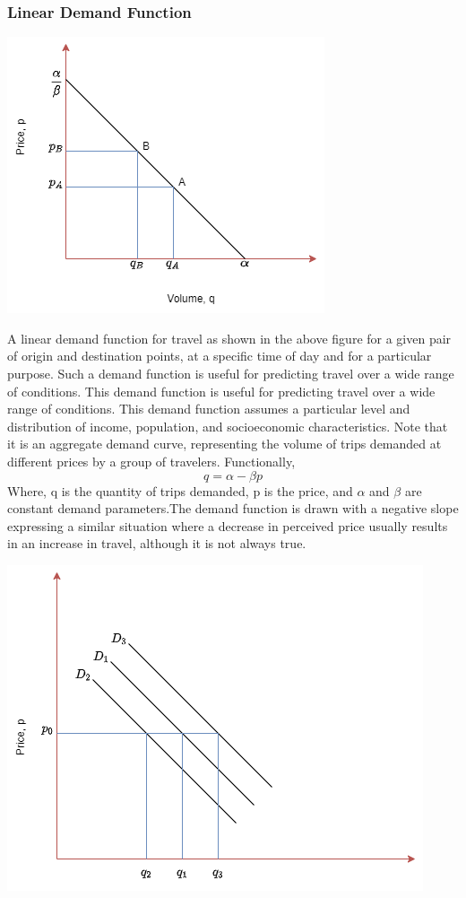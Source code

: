 \subsubsection{Linear Demand Function}
\begin{center}
	\includegraphics[scale=0.6]{gfx/fig40.png}
\end{center}
A linear demand function for travel as shown in the above figure for a given pair of origin and destination points, at a specific time of day and for a particular purpose. Such a demand function is useful for predicting travel over a wide range of conditions. This demand function is useful for predicting travel over a wide range of conditions. This demand function assumes a particular level and distribution of income, population, and socioeconomic characteristics. Note that it is an aggregate demand curve, representing the volume of trips demanded at different prices by a group of travelers. Functionally,
\begin{equation}
	q = \alpha - \beta p
	\label{linearDemandFunction}
\end{equation}
Where, q is the quantity of trips demanded, p is the price, and $\alpha$ and $\beta$ are constant demand parameters.The demand function is drawn with a negative slope expressing a similar situation where a decrease in perceived price usually results in an increase in travel, although it is not always true.
\begin{center}
	\includegraphics[scale=0.5]{gfx/fig41.png}
\end{center}
